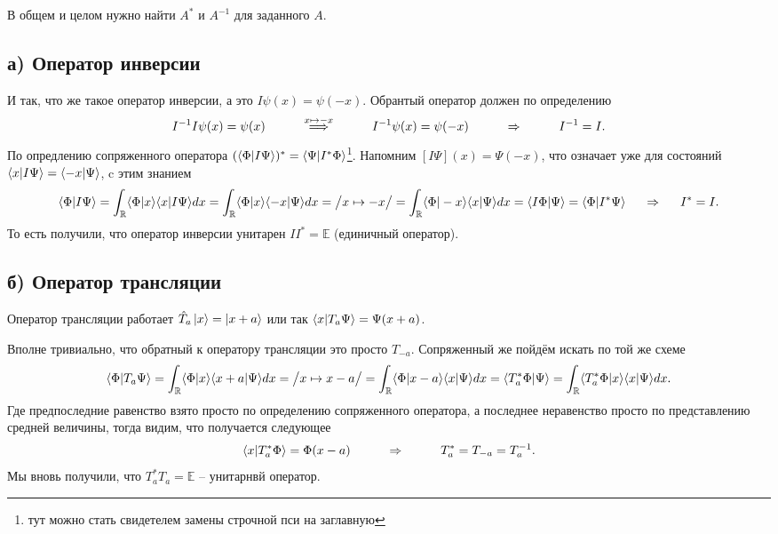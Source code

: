 В общем и целом нужно найти $A^*$ и $A^{-1}$ для заданного $A$. 
\subsection*{а) Оператор инверсии}
И так, что же такое оператор инверсии, а это $I \psi(x) = \psi(-x)$.
Обрантый оператор должен по определению
\begin{equation*}
	I^{-1} I \psi(x) = \psi(x)
	\hspace{1 cm}
	\overset{x \mapsto -x}{\Longrightarrow}
	\hspace{1 cm}
	I^{-1} \psi(x) = \psi(-x)
	\hspace{1 cm}
	\Rightarrow
	\hspace{1 cm}
	I^{-1} = I.
\end{equation*}
По опредлению сопряженного оператора $(\bk{\Phi}{I \Psi})^* = \bk{\Psi}{I^* \Phi}$\footnote{тут можно стать свидетелем замены строчной пси на заглавную}.
Напомним
$[I\Psi](x) = \Psi(-x)$, что означает уже для состояний $\bk{x}{I \Psi} = \bk{- x}{\Psi}$, c этим знанием
\begin{equation*}
	\bk{\Phi}{I \Psi} = \int_{\mathbb{R}} \bk{\Phi}{x} \bk{x}{I \Psi} d x
	=
	\int_{\mathbb{R}} \bk{\Phi}{x}\bk{-x}{\Psi} d x =\big/ x \mapsto - x \big/ =  \int_{\mathbb{R}} \bk{\Phi}{- x}\bk{x}{\Psi} d x
	=
	\bk{I \Phi}{\Psi} = \bk{\Phi}{I^* \Psi}
	\hspace{0.5 cm}
	\Rightarrow
	\hspace{0.5 cm}
	I^{*} = I.
\end{equation*}
То есть получили, что оператор инверсии унитарен $I I^* = \mathbb{E}$ (единичный оператор).

\subsection*{б) Оператор трансляции}
Оператор трансляции работает $\hat{T}_a \left| x \right\rangle = \left| x+a \right\rangle$ или так $\bk{x}{T_a\Psi} = \Psi(x + a)$.

Вполне тривиально, что обратный к оператору трансляции это просто $T_{-a}$. Сопряженный же пойдём искать по той же схеме
\begin{equation*}
	\bk{\Phi}{T_a \Psi} = \int_{\mathbb{R}} \bk{\Phi}{x} \bk{x+a}{\Psi} d x 
	= 
	\big/ x \mapsto x - a\big/
	=
	\int_{\mathbb{R}} \bk{\Phi}{x-a} \bk{x}{\Psi} d x 
	=
	\bk{T_a^{*}\Phi}{\Psi}
	=
	\int_{\mathbb{R}} \bk{T_a^{*}\Phi}{x} \bk{x}{\Psi} d x. 
\end{equation*}
Где предпоследние равенство взято просто по определению сопряженного оператора, а последнее неравенство просто по представлению средней величины, тогда видим, что получается следующее
\begin{align*}
	\bk{x}{T_a^* \Phi} = \Phi(x-a)
	\hspace{1 cm}
	\Rightarrow
	\hspace{1 cm}
	T_a^* = T_{-a} = T_a^{-1}.
\end{align*}
Мы вновь получили, что $T_a^* T_a = \mathbb{E}$ -- унитарнвй оператор.